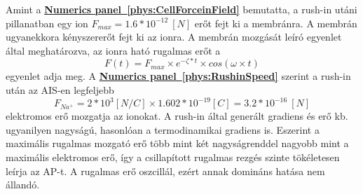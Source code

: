 {

Amint a  
\textbf{\hyperlink{phys:CellForceinField}{Numerics panel~\ref{phys:CellForceinField}}} bemutatta, a rush-in utáni 
pillanatban egy ion $F_{max} = 1.6*10^{-12}\ [N]$ erőt fejt ki a membránra.
A membrán ugyanekkora kényszererőt fejt ki az ionra. 
A membrán mozgását leíró egyenlet által meghatározva, az ionra ható rugalmas erőt a
\[
F(t) = F_{max}\times e^{-\zeta*t}\times cos(\omega\times t)
\]
\noindent 
egyenlet adja meg. A \textbf{\hyperlink{phys:RushinSpeed}{Numerics panel~\ref{phys:RushinSpeed}}} szerint a rush-in után az \gls{AIS}-en
legfeljebb
%
\begin{equation}
	F_{Na^+}= 2*10^3  [N/C] \times 1.602* 10^{-19} [C] = 3.2*10^{-16}\ [N] \label{eq:ElecticForce}
\end{equation}
%
\noindent
elektromos erő mozgatja az ionokat. A rush-in által generált gradiens és
erő kb. ugyanilyen nagyságú, hasonlóan a termodinamikai gradiens is.
Eszerint a maximális rugalmas mozgató erő több mint két nagyságrenddel nagyobb mint a maximális elektromos erő, így a csillapított rugalmas rezgés szinte tökéletesen leírja az \gls{AP}-t. A rugalmas erő oszcillál, ezért annak domináns hatása nem állandó.

}
